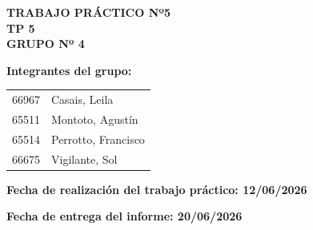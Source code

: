 \begin{center}
    
    {\large \textbf{TRABAJO PRÁCTICO Nº5}}\\[0.5cm]
    
    {\Large \textbf{TP 5}}\\[1cm]
    
    {\normalsize \textbf{GRUPO Nº 4}}\\[0.5cm]

\end{center}

\vspace{0.5cm}

\textbf{Integrantes del grupo:}

\vspace{0.3cm}

\begin{tabular}{p{5cm} p{8cm}}
66967 & Casais, Leila \\
65511 & Montoto, Agustín \\
65514 & Perrotto, Francisco \\
66675 & Vigilante, Sol \\
\end{tabular}

\vspace{0.8cm}

\textbf{Fecha de realización del trabajo práctico: 12/06/2026} \\
\vspace{0.3cm}

\textbf{Fecha de entrega del informe: 20/06/2026}

\vspace{1cm}

\newpage